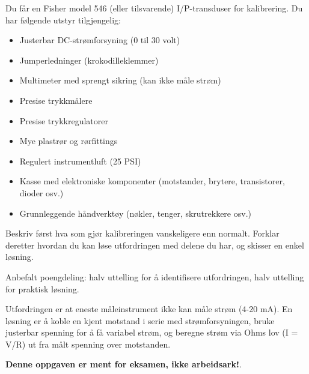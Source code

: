

Du får en Fisher model 546 (eller tilsvarende) I/P-transduser for kalibrering. Du har følgende utstyr tilgjengelig:

\begin{itemize}
\item{} Justerbar DC-strømforsyning (0 til 30 volt)
\item{} Jumperledninger (krokodilleklemmer)
\item{} Multimeter med sprengt sikring (kan ikke måle strøm)
\item{} Presise trykkmålere
\item{} Presise trykkregulatorer
\item{} Mye plastrør og rørfittings
\item{} Regulert instrumentluft (25 PSI)
\item{} Kasse med elektroniske komponenter (motstander, brytere, transistorer, dioder osv.)
\item{} Grunnleggende håndverktøy (nøkler, tenger, skrutrekkere osv.)
\end{itemize}

Beskriv først hva som gjør kalibreringen vanskeligere enn normalt. Forklar deretter hvordan du kan løse utfordringen med delene du har, og skisser en enkel løsning.







Anbefalt poengdeling: halv uttelling for å identifisere utfordringen, halv uttelling for praktisk løsning.

\vskip 10pt

Utfordringen er at eneste måleinstrument ikke kan måle strøm (4-20 mA). En løsning er å koble en kjent motstand i serie med strømforsyningen, bruke justerbar spenning for å få variabel strøm, og beregne strøm via Ohms lov (I = V/R) ut fra målt spenning over motstanden.







{\bf Denne oppgaven er ment for eksamen, ikke arbeidsark!}.

